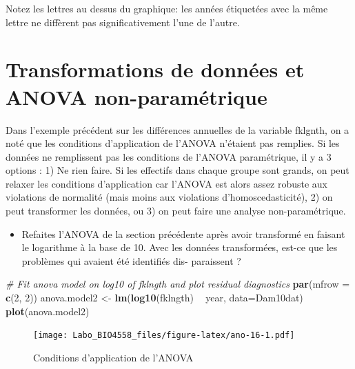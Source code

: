 \documentclass[12pt,]{book}
\newenvironment{Shaded}{\begin{snugshade}}{\end{snugshade}}
\newcommand{\CommentTok}[1]{\textcolor[rgb]{0.37,0.37,0.37}{\textit{#1}}}
\newcommand{\DataTypeTok}[1]{\textcolor[rgb]{0.27,0.27,0.27}{#1}}
\newcommand{\DecValTok}[1]{\textcolor[rgb]{0.06,0.06,0.06}{#1}}
\newcommand{\KeywordTok}[1]{\textcolor[rgb]{0.27,0.27,0.27}{\textbf{#1}}}
\newcommand{\NormalTok}[1]{#1}
\newcommand{\OperatorTok}[1]{\textcolor[rgb]{0.43,0.43,0.43}{\textbf{#1}}}
\newcommand{\StringTok}[1]{\textcolor[rgb]{0.5,0.5,0.5}{#1}}
\providecommand{\tightlist}{%
  \setlength{\itemsep}{0pt}\setlength{\parskip}{0pt}}
\begin{document}
Notez les lettres au dessus du graphique: les années étiquetées avec la même lettre ne diffèrent pas significativement l'une de l'autre.

\hypertarget{transformations-de-donnuxe9es-et-anova-non-paramuxe9trique}{%
\section{Transformations de données et ANOVA non-paramétrique}\label{transformations-de-donnuxe9es-et-anova-non-paramuxe9trique}}

Dans l'exemple précédent sur les différences annuelles de la variable fklgnth, on a noté que les conditions d'application de l'ANOVA n'étaient pas remplies. Si les données ne remplissent pas les conditions de l'ANOVA paramétrique, il y a 3 options : 1) Ne rien faire. Si les effectifs dans chaque groupe sont grands, on peut relaxer les conditions d'application car l'ANOVA est alors assez robuste aux violations de normalité (mais moins aux violations d'homoscedasticité), 2) on peut transformer les données, ou 3) on peut faire une analyse non-paramétrique.

\begin{itemize}
\tightlist
\item
  Refaites l'ANOVA de la section précédente après avoir transformé en faisant le logarithme à la base de 10. Avec les données transformées, est-ce que les problèmes qui avaient été identifiés dis- paraissent ?
\end{itemize}

\begin{Shaded}
\begin{Highlighting}[]
\CommentTok{# Fit anova model on log10 of fklngth and plot residual diagnostics}
\KeywordTok{par}\NormalTok{(}\DataTypeTok{mfrow =} \KeywordTok{c}\NormalTok{(}\DecValTok{2}\NormalTok{, }\DecValTok{2}\NormalTok{))}
\NormalTok{anova.model2 <-}\StringTok{ }\KeywordTok{lm}\NormalTok{(}\KeywordTok{log10}\NormalTok{(fklngth) }\OperatorTok{~}\StringTok{ }\NormalTok{year, }\DataTypeTok{data=}\NormalTok{Dam10dat)}
\KeywordTok{plot}\NormalTok{(anova.model2)}
\end{Highlighting}
\end{Shaded}

\begin{figure}
\centering
\texttt{[image: Labo\_BIO4558\_files/figure-latex/ano-16-1.pdf]}
\caption{\label{fig:ano-16}Conditions d'application de l'ANOVA}
\end{figure}
\end{document}
